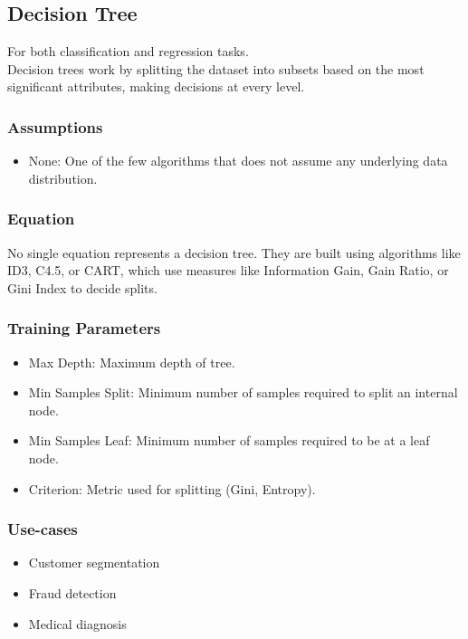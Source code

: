 \documentclass[english, threecolumn]{latex4ei/latex4ei_sheet}
\begin{document}
\begin{sectionbox}
    \subsection{Decision Tree}
For both classification and regression tasks. \\
Decision trees work by splitting the dataset into subsets based on the most significant attributes, making decisions at every level.

\subsubsection{Assumptions}
\begin{itemize}
    \item None: One of the few algorithms that does not assume any underlying data distribution.
\end{itemize}

\subsubsection{Equation}
No single equation represents a decision tree. They are built using algorithms like ID3, C4.5, or CART, which use measures like Information Gain, Gain Ratio, or Gini Index to decide splits.

\subsubsection{Training Parameters}
\begin{itemize}
    \item Max Depth: Maximum depth of tree.
    \item Min Samples Split: Minimum number of samples required to split an internal node.
    \item Min Samples Leaf: Minimum number of samples required to be at a leaf node.
    \item Criterion: Metric used for splitting (Gini, Entropy).
\end{itemize}

\subsubsection{Use-cases}
\begin{itemize}
    \item Customer segmentation
    \item Fraud detection
    \item Medical diagnosis
\end{itemize}


\end{sectionbox}
\end{document}

